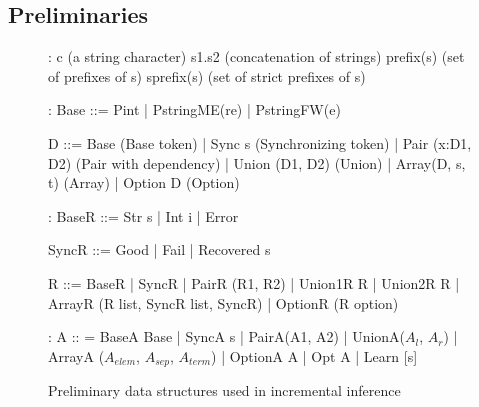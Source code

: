 
\subsection{Preliminaries}

\begin{figure}[t]
{\small 
\begin{code}
:
c          (a string character)	
s1.s2      (concatenation of strings)
prefix(s)  (set of prefixes of s)
sprefix(s) (set of strict prefixes of s)

\cdmath
{}:
Base ::= Pint | PstringME(re) | PstringFW(e)

D ::=   
  Base               (Base token)
| Sync s             (Synchronizing token) 
| Pair (x:D1, D2)    (Pair with dependency)
| Union (D1, D2)     (Union)
| Array(D, s, t)     (Array)
| Option D           (Option)

:
BaseR ::= Str s | Int i | Error

SyncR ::= Good | Fail | Recovered s 

R ::=
  BaseR
| SyncR
| PairR (R1, R2)
| Union1R R | Union2R R 
| ArrayR (R list, SyncR list, SyncR)
| OptionR (R option)

:
A :: = 
  BaseA Base
| SyncA s
| PairA(A1, A2)
| UnionA($A_l$, $A_r$)
| ArrayA ($A_{elem}$, $A_{sep}$, $A_{term}$)
| OptionA A
| Opt A
| Learn [s]
\end{code}
}
\caption{Preliminary data structures used in incremental inference}
\label{fig:data-structures}
\end{figure}

